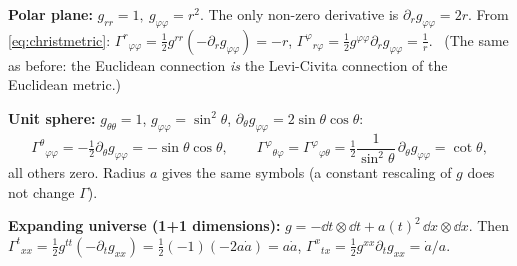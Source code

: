 \begin{example}
\textbf{Polar plane:} $g_{rr}=1,\ g_{\varphi\varphi}=r^2$. The only non-zero derivative is $\partial_rg_{\varphi\varphi}=2r$. From \eqref{eq:christmetric}: $\Gamma^r{}_{\varphi\varphi}=\frac12g^{rr}(-\partial_rg_{\varphi\varphi})=-r$, $\Gamma^\varphi{}_{r\varphi}=\frac12g^{\varphi\varphi}\partial_rg_{\varphi\varphi}=\frac1r$. \checkmark\ (The same as before: the Euclidean connection \emph{is} the Levi-Civita connection of the Euclidean metric.)

\textbf{Unit sphere:} $g_{\theta\theta}=1$, $g_{\varphi\varphi}=\sin^2\theta$, $\partial_\theta g_{\varphi\varphi}=2\sin\theta\cos\theta$:
\[
\Gamma^\theta{}_{\varphi\varphi}=-\tfrac12\partial_\theta g_{\varphi\varphi}=-\sin\theta\cos\theta,\qquad
\Gamma^\varphi{}_{\theta\varphi}=\Gamma^\varphi{}_{\varphi\theta}=\tfrac12\frac{1}{\sin^2\theta}\,\partial_\theta g_{\varphi\varphi}=\cot\theta,
\]
all others zero. Radius $a$ gives the same symbols (a constant rescaling of $g$ does not change $\Gamma$).

\textbf{Expanding universe (1+1 dimensions):} $g=-\dd t\otimes\dd t+a(t)^2\,\dd x\otimes\dd x$. Then $\Gamma^t{}_{xx}=\tfrac12g^{tt}(-\partial_tg_{xx})=\tfrac12(-1)(-2a\dot a)=a\dot a$, $\Gamma^x{}_{tx}=\tfrac12g^{xx}\partial_tg_{xx}=\dot a/a$.
\end{example}

